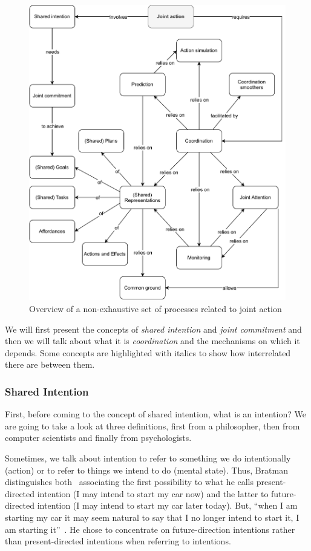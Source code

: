 \documentclass[a4paper,11pt,twoside]{StyleThese}
\begin{document}
\begin{figure}[!ht]
	\includegraphics[width=\linewidth]{figures/chapter1/joint_action.pdf}
	\caption{Overview of a non-exhaustive set of processes related to joint action}
	\label{chap1:fig:ja}
\end{figure}

We will first present the concepts of \textit{shared intention} and \textit{joint commitment} and then we will talk about what it is \textit{coordination} and the mechanisms on which it depends. Some concepts are highlighted with italics to show how interrelated there are between them.

\subsubsection{Shared Intention}
First, before coming to the concept of shared intention, what is an intention? We are going to take a look at three definitions, first from a philosopher, then from computer scientists and finally from psychologists. 

Sometimes, we talk about intention to refer to something we do intentionally (action) or to refer to things we intend to do (mental state). Thus, Bratman distinguishes both~\cite{bratman_1984_two} associating the first possibility to what he calls present-directed intention (I may intend to start my car now) and the latter to future-directed intention (I may intend to start my car later today). But, ``when I am starting my car it may seem natural to say that I no longer intend to start it, I am starting it''~\cite[p.~379]{bratman_1984_two}. He chose to concentrate on future-direction intentions rather than present-directed intentions when referring to intentions. 
\end{document}
